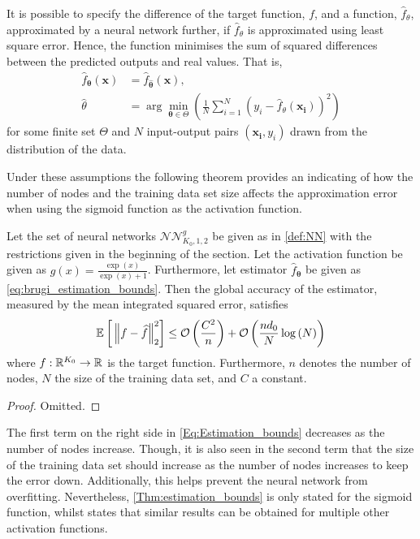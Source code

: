 It is possible to specify the difference of the target function, $f$, and a function, $\hat{f}_\theta$, approximated by a neural network further, if $\hat{f}_\theta$ is approximated using least square error. Hence, the function minimises the sum of squared differences between the predicted outputs and real values. That is,
\begin{align}\label{eq:brugi_estimation_bounds}
    \hat{f}_{\bm{\theta}}(\bm{x}) &= \hat{f}_{\hat{\bm{\theta}}}(\bm{x}), \\
    \hat{\theta} &= \arg \min_{\bm{\theta} \in \Theta} \left(\frac{1}{N} \sum_{i = 1}^N \left(y_i - \hat{f}_{\theta}(\bm{x_i})\right)^2 \right)
\end{align}
for some finite set $\Theta$ and $N$ input-output pairs $(\bm{x_i}, y_i)$ drawn from the distribution of the data. 

Under these assumptions the following theorem provides an indicating of how the number of nodes and the training data set size affects the approximation error when using the sigmoid function as the activation function. 
\begin{thm}\label{Thm:estimation_bounds}
    Let the set of neural networks $\mathcal{NN}^g_{K_0, 1, 2}$ be given as in \autoref{def:NN} with the restrictions given in the beginning of the section. Let the activation function be given as $g(x) = \frac{\exp{(x)}}{\exp{(x)}+1}$. Furthermore, let estimator $\hat{f}_{\bm{\theta}}$ be given as \eqref{eq:brugi_estimation_bounds}. Then the global accuracy of the estimator, measured by the mean integrated squared error, satisfies
    \begin{align}\label{Eq:Estimation_bounds}
        \E{\norm{f-\hat{f}}_2^2} \leq \mathcal{O}\left(\frac{C^2}{n} \right) + \mathcal{O}\left(\frac{nd_0}{N} \log{(N)} \right) 
    \end{align}
    where $f: \mathbb{R}^{K_0} \to \mathbb{R}$ is the target function. Furthermore, $n$ denotes the number of nodes, $N$ the size of the training data set, and $C$ a constant.
\end{thm}
\begin{proof}
    Omitted.
\end{proof}

The first term on the right side in \eqref{Eq:Estimation_bounds} decreases as the number of nodes increase. Though, it is also seen in the second term that the size of the training data set should increase as the number of nodes increases to keep the error down. Additionally, this helps prevent the neural network from overfitting. Nevertheless, \autoref{Thm:estimation_bounds} is only stated for the sigmoid function, whilst \citep[s. 117]{Barron} states that similar results can be obtained for multiple other activation functions.

